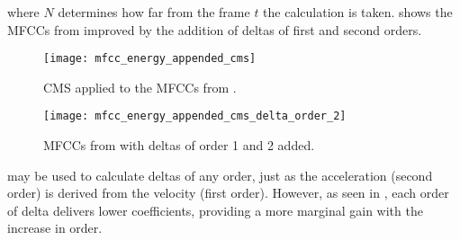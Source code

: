 \noindent where $N$ determines how far from the frame $t$ the calculation is taken.  shows the MFCCs from  improved by the addition of deltas of first and second orders.

\begin{figure}[ht]
    \centering
    \texttt{[image: mfcc\_energy\_appended\_cms]}
    \caption{CMS applied to the MFCCs from .}
    \label{fig:mfcc_energy_appended_cms}
\end{figure}

\begin{figure}[ht]
    \centering
    \texttt{[image: mfcc\_energy\_appended\_cms\_delta\_order\_2]}
    \caption{MFCCs from  with deltas of order 1 and 2 added.}
    \label{fig:mfcc_energy_appended_cms_delta_order_2}
\end{figure}

 may be used to calculate deltas of any order, just as the acceleration (second order) is derived from the velocity (first order). However, as seen in , each order of delta delivers lower coefficients, providing a more marginal gain with the increase in order.